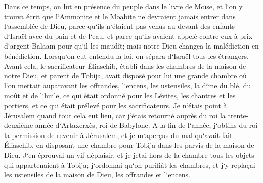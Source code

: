 \verse Dans ce temps, on lut en présence du peuple dans le livre de Moïse, et l`on y trouva écrit que l`Ammonite et le Moabite ne devraient jamais entrer dans l`assemblée de Dieu, 
\verse parce qu`ils n`étaient pas venus au-devant des enfants d`Israël avec du pain et de l`eau, et parce qu`ils avaient appelé contre eux à prix d`argent Balaam pour qu`il les maudît; mais notre Dieu changea la malédiction en bénédiction. 
\verse Lorsqu`on eut entendu la loi, on sépara d`Israël tous les étrangers. 
\verse Avant cela, le sacrificateur Éliaschib, établi dans les chambres de la maison de notre Dieu, et parent de Tobija, 
\verse avait disposé pour lui une grande chambre où l`on mettait auparavant les offrandes, l`encens, les ustensiles, la dîme du blé, du moût et de l`huile, ce qui était ordonné pour les Lévites, les chantres et les portiers, et ce qui était prélevé pour les sacrificateurs. 
\verse Je n`étais point à Jérusalem quand tout cela eut lieu, car j`étais retourné auprès du roi la trente-deuxième année d`Artaxerxès, roi de Babylone. 
\verse A la fin de l`année, j`obtins du roi la permission de revenir à Jérusalem, et je m`aperçus du mal qu`avait fait Éliaschib, en disposant une chambre pour Tobija dans les parvis de la maison de Dieu. 
\verse J`en éprouvai un vif déplaisir, et je jetai hors de la chambre tous les objets qui appartenaient à Tobija; 
\verse j`ordonnai qu`on purifiât les chambres, et j`y replaçai les ustensiles de la maison de Dieu, les offrandes et l`encens. 
